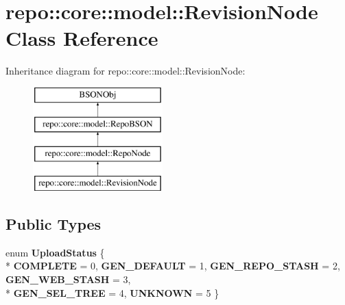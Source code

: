 \hypertarget{classrepo_1_1core_1_1model_1_1_revision_node}{}\section{repo\+:\+:core\+:\+:model\+:\+:Revision\+Node Class Reference}
\label{classrepo_1_1core_1_1model_1_1_revision_node}
Inheritance diagram for repo\+:\+:core\+:\+:model\+:\+:Revision\+Node\+:\begin{figure}[H]
\begin{center}
\leavevmode
\includegraphics[height=4.000000cm]{classrepo_1_1core_1_1model_1_1_revision_node}
\end{center}
\end{figure}
\subsection*{Public Types}
\begin{DoxyCompactItemize}
\item 
\hypertarget{classrepo_1_1core_1_1model_1_1_revision_node_ae0b95edf7e0e59bce7365ad979c2704a}{}enum {\bfseries Upload\+Status} \{ \\*
{\bfseries C\+O\+M\+P\+L\+E\+T\+E} = 0, 
{\bfseries G\+E\+N\+\_\+\+D\+E\+F\+A\+U\+L\+T} = 1, 
{\bfseries G\+E\+N\+\_\+\+R\+E\+P\+O\+\_\+\+S\+T\+A\+S\+H} = 2, 
{\bfseries G\+E\+N\+\_\+\+W\+E\+B\+\_\+\+S\+T\+A\+S\+H} = 3, 
\\*
{\bfseries G\+E\+N\+\_\+\+S\+E\+L\+\_\+\+T\+R\+E\+E} = 4, 
{\bfseries U\+N\+K\+N\+O\+W\+N} = 5
 \}\label{classrepo_1_1core_1_1model_1_1_revision_node_ae0b95edf7e0e59bce7365ad979c2704a}

\end{DoxyCompactItemize}
